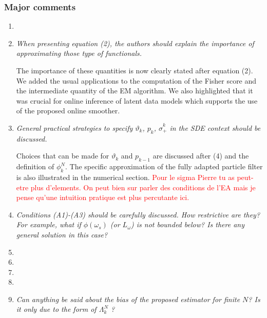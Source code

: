 \documentclass[12pt]{article}
\newcommand{\1}{\mathrm{1}}
\begin{document}
\subsubsection*{Major comments}
\begin{enumerate}
\item
\item {\em When presenting equation (2), the authors should explain the importance of approximating those type of functionals.}

\vspace{.3cm}

The importance of these quantities is now clearly stated after equation (2). We added the usual applications to the computation of the Fisher score and the intermediate quantity of the EM algorithm. We also highlighted that it was crucial for online inference of latent data models which supports the use of the proposed online smoother.

\item {\em General practical strategies to specify $\vartheta_k$, $p_k$, $\hat{\sigma}_+^k$ in the SDE context should be
discussed.}

\vspace{.3cm}

Choices that can be made for  $\vartheta_k$ and $p_{k-1}$ are discussed after (4) and the definition of $\phi_k^N$. The specific approximation of the fully adapted particle filter is also illustrated in the numerical section. \textcolor{red}{Pour le sigma Pierre tu as peut-etre plus d'elements. On peut bien sur parler des conditions de l'EA mais je pense qu'une intuition pratique est plus percutante ici.}

\item {\em Conditions (A1)-(A3) should be carefully discussed. How restrictive are they? For
example, what if $\phi(\omega_s)$ (or $L_\omega$) is not bounded below? Is there any general solution
in this case?}

\vspace{.3cm}

\item
\item
\item
\item
\item {\em Can anything be said about the bias of the proposed estimator for finite $N$? Is it
only due to the form of  $\Lambda_k^N$ ?}

\vspace{.3cm}



\end{enumerate}
\end{document}
